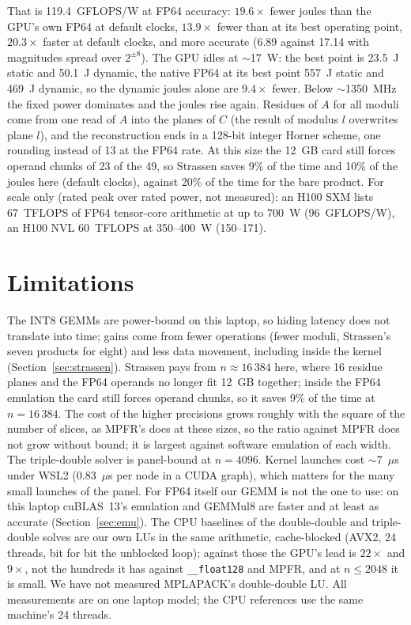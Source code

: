 \documentclass[11pt]{article}
\begin{document}
That is 119.4~GFLOPS/W at FP64 accuracy: $19.6\times$ fewer joules than the GPU's own FP64 at default clocks, $13.9\times$
fewer than at its best operating point, $20.3\times$ faster at default clocks, and more accurate (6.89 against 17.14 with
magnitudes spread over $2^{\pm8}$). The GPU idles at $\sim$17~W: the best point is 23.5~J static and 50.1~J dynamic, the native FP64 at its best point
557~J static and 469~J dynamic, so the dynamic joules alone are $9.4\times$ fewer. Below $\sim$1350~MHz the fixed power
dominates and the joules rise again. Residues of $A$ for all moduli come from one read of $A$ into the planes of $C$ (the
result of modulus $l$ overwrites plane $l$), and the reconstruction ends in a 128-bit integer Horner scheme, one rounding
instead of 13 at the FP64 rate. At this size the 12~GB card still forces operand chunks of 23 of the 49, so Strassen saves
9\% of the time and 10\% of the joules here (default clocks), against 20\% of the time for the bare product. For scale only
(rated peak over rated power, not measured): an H100 SXM lists 67~TFLOPS of FP64 tensor-core arithmetic at up to 700~W
(96~GFLOPS/W), an H100 NVL 60~TFLOPS at 350--400~W (150--171).

\section{Limitations}
The INT8 GEMMs are power-bound on this laptop, so hiding latency does not translate into time; gains come from fewer
operations (fewer moduli, Strassen's seven products for eight) and less data movement, including inside the kernel
(Section~\ref{sec:strassen}). Strassen pays from $n\approx16\,384$ here, where 16 residue planes and the FP64 operands no
longer fit 12~GB together; inside the FP64 emulation the card still forces operand chunks, so it saves 9\% of the time at $n=16\,384$. The cost of the higher precisions grows roughly with the square of the
number of slices, as MPFR's does at these sizes, so the ratio against MPFR does not grow without bound; it is largest
against software emulation of each width. The triple-double solver is panel-bound at $n=4096$. Kernel launches cost
$\sim$7~$\mu$s under WSL2 (0.83~$\mu$s per node in a CUDA graph), which matters for the many small launches of the panel.
For FP64 itself our GEMM is not the one to use: on this laptop cuBLAS~13's emulation and GEMMul8 are faster and at least as
accurate (Section~\ref{sec:emu}). The CPU baselines of the double-double and triple-double solves are our own LUs in the same
arithmetic, cache-blocked (AVX2, 24 threads, bit for bit the unblocked loop); against those the GPU's lead is $22\times$
and $9\times$, not the hundreds it has against \texttt{\_\_float128} and MPFR, and at $n\le2048$ it is small. We have not measured
MPLAPACK's double-double LU. All measurements are on one laptop model; the CPU references use the same machine's 24 threads.
\end{document}
